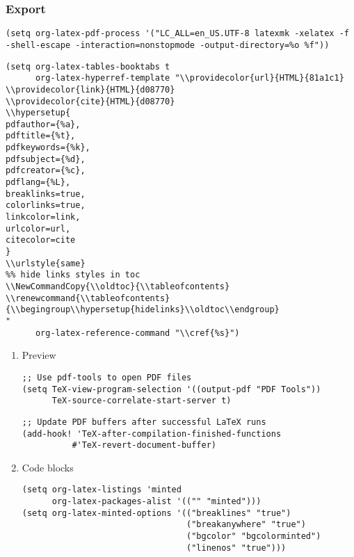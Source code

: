 \documentclass[c]{article}
\theoremstyle{plain}%
\theoremstyle{definition}
\theoremstyle{remark}
\renewcommand{\tableofcontents}{\begingroup\hypersetup{hidelinks}\oldtoc\endgroup}
\begin{document}
\subsubsection{Export}
\label{sec:orgba60e48}
\begin{verbatim}
(setq org-latex-pdf-process '("LC_ALL=en_US.UTF-8 latexmk -xelatex -f  -shell-escape -interaction=nonstopmode -output-directory=%o %f"))
\end{verbatim}
\begin{verbatim}
(setq org-latex-tables-booktabs t
      org-latex-hyperref-template "\\providecolor{url}{HTML}{81a1c1}
\\providecolor{link}{HTML}{d08770}
\\providecolor{cite}{HTML}{d08770}
\\hypersetup{
pdfauthor={%a},
pdftitle={%t},
pdfkeywords={%k},
pdfsubject={%d},
pdfcreator={%c},
pdflang={%L},
breaklinks=true,
colorlinks=true,
linkcolor=link,
urlcolor=url,
citecolor=cite
}
\\urlstyle{same}
%% hide links styles in toc
\\NewCommandCopy{\\oldtoc}{\\tableofcontents}
\\renewcommand{\\tableofcontents}{\\begingroup\\hypersetup{hidelinks}\\oldtoc\\endgroup}
"
      org-latex-reference-command "\\cref{%s}")
\end{verbatim}
\begin{enumerate}
\item Preview
\label{sec:org6ad8bc4}
\begin{verbatim}
;; Use pdf-tools to open PDF files
(setq TeX-view-program-selection '((output-pdf "PDF Tools"))
      TeX-source-correlate-start-server t)
\end{verbatim}
\begin{verbatim}
;; Update PDF buffers after successful LaTeX runs
(add-hook! 'TeX-after-compilation-finished-functions
          #'TeX-revert-document-buffer)
\end{verbatim}
\item Code blocks
\label{sec:org6790e8e}
\begin{verbatim}
(setq org-latex-listings 'minted
      org-latex-packages-alist '(("" "minted")))
(setq org-latex-minted-options '(("breaklines" "true")
                                 ("breakanywhere" "true")
                                 ("bgcolor" "bgcolorminted")
                                 ("linenos" "true")))
\end{verbatim}
\end{enumerate}
\end{document}
